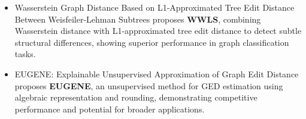 \documentclass[../Thesis.tex]{subfiles}
\begin{document}
\begin{itemize}
		\item Wasserstein Graph Distance Based on L1-Approximated Tree Edit Distance Between Weisfeiler-Lehman Subtrees \cite{wasserstein_graph_distance_based_on_l1_approximated_tree_edit_distance_between_weisfeiler_lehman_subtrees} proposes \textbf{WWLS}, combining Wasserstein distance with L1-approximated tree edit distance to detect subtle structural differences, showing superior performance in graph classification tasks.
		
		\item EUGENE: Explainable Unsupervised Approximation of Graph Edit Distance \cite{eugene__explainable_unsupervised_approximation_of_graph_edit_distance} proposes \textbf{EUGENE}, an unsupervised method for GED estimation using algebraic representation and rounding, demonstrating competitive performance and potential for broader applications.
	\end{itemize}
	
	
\end{document}
